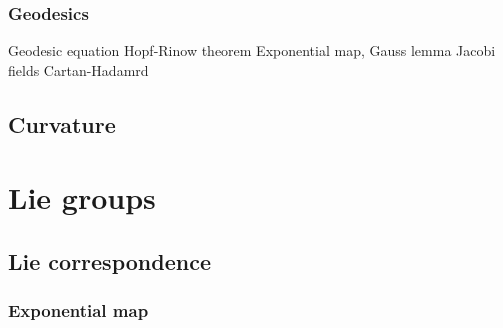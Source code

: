 \documentclass{../../large}
\begin{document}
\section{Geodesics}
Geodesic equation
Hopf-Rinow theorem
Exponential map, Gauss lemma
Jacobi fields
Cartan-Hadamrd






\chapter{Curvature}




\chapter{}
























\part{Lie groups}
\chapter{Lie correspondence}
\section{Exponential map}
\begin{prb}
\end{prb}
\begin{prb}
\end{prb}

\begin{prb}
\end{prb}

\begin{prb}
\end{prb}
\end{document}
